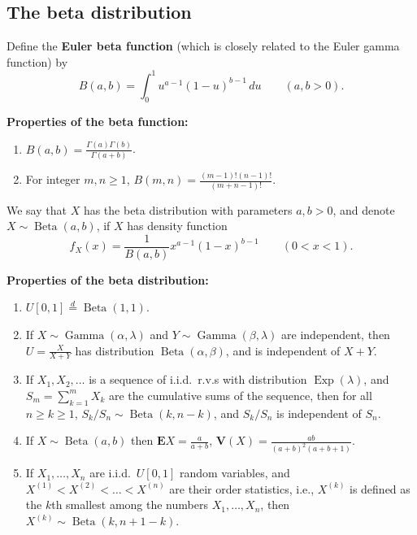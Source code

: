 \documentclass[12pt]{article}
\newcommand{\expec}{\mathbf{E}}
\newcommand{\var}{\mathbf{V}}
\newcommand{\eqdist}{\stackrel{d}{=}}
\newcommand{\expdist}{\operatorname{Exp}}
\newcommand{\gammadist}{\operatorname{Gamma}}
\newcommand{\betadist}{\operatorname{Beta}}
\theoremstyle{example}
\begin{document}
\subsection{The beta distribution}

Define the \textbf{Euler beta function} (which is closely related to the Euler gamma function) by
$$ B(a,b) = \int_0^1 u^{a-1}(1-u)^{b-1}\,du \qquad (a,b>0). $$

\noindent \textbf{Properties of the beta function:}
\begin{enumerate}
\item $B(a,b) = \frac{\Gamma(a) \Gamma(b)}{\Gamma(a+b)}$.
\item For integer $m,n\ge 1$, $B(m,n) = \frac{(m-1)! (n-1)!}{(m+n-1)!}$.
\end{enumerate}

We say that $X$ has the beta distribution with parameters $a,b>0$, and denote $X\sim \betadist(a,b)$, if $X$ has density function
$$
f_X(x) = \frac{1}{B(a,b)} x^{a-1} (1-x)^{b-1} \qquad (0<x<1).
$$

\noindent \textbf{Properties of the beta distribution:}
\begin{enumerate}

\item $U[0,1] \eqdist \betadist(1,1)$.

\item If $X \sim \gammadist(\alpha,\lambda)$ and $Y\sim \gammadist(\beta,\lambda)$ are independent, then $U = \frac{X}{X+Y}$ has distribution $\betadist(\alpha,\beta)$, and is independent of $X+Y$.

\item If $X_1,X_2,\ldots$ is a sequence of i.i.d.\ r.v.s with distribution $\expdist(\lambda)$, and $S_m = \sum_{k=1}^m X_k$ are the cumulative sums of the sequence, then for all $n\ge k\ge1$, $S_k/S_n \sim \betadist(k,n-k)$, and $S_k/S_n$ is independent of $S_n$.

\item If $X\sim \betadist(a,b)$ then $\expec X = \frac{a}{a+b}$, $\var(X) = \frac{ab}{(a+b)^2 (a+b+1)}$.

\item If $X_1,\ldots,X_n$ are i.i.d.\ $U[0,1]$ random variables, and $X^{(1)} < X^{(2)} < \ldots < X^{(n)}$ are their order statistics, i.e., $X^{(k)}$ is defined as the $k$th smallest among the numbers $X_1,\ldots,X_n$, then $X^{(k)} \sim \betadist(k,n+1-k)$.

\end{enumerate}
\end{document}

